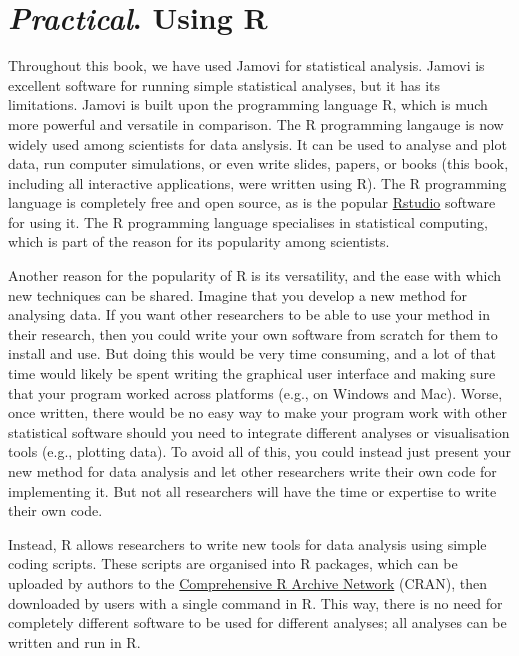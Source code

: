 \documentclass[
]{scrbook}
\begin{document}
\hypertarget{Chapter_35}{%
\chapter{\texorpdfstring{\emph{Practical}. Using R}{Practical. Using R}}\label{Chapter_35}}

Throughout this book, we have used Jamovi for statistical analysis.
Jamovi is excellent software for running simple statistical analyses, but it has its limitations.
Jamovi is built upon the programming language R, which is much more powerful and versatile in comparison.
The R programming langauge is now widely used among scientists for data anslysis.
It can be used to analyse and plot data, run computer simulations, or even write slides, papers, or books (this book, including all interactive applications, were written using R).
The R programming language is completely free and open source, as is the popular \href{https://posit.co/downloads/}{Rstudio} software for using it.
The R programming language specialises in statistical computing, which is part of the reason for its popularity among scientists.

Another reason for the popularity of R is its versatility, and the ease with which new techniques can be shared.
Imagine that you develop a new method for analysing data.
If you want other researchers to be able to use your method in their research, then you could write your own software from scratch for them to install and use.
But doing this would be very time consuming, and a lot of that time would likely be spent writing the graphical user interface and making sure that your program worked across platforms (e.g., on Windows and Mac).
Worse, once written, there would be no easy way to make your program work with other statistical software should you need to integrate different analyses or visualisation tools (e.g., plotting data).
To avoid all of this, you could instead just present your new method for data analysis and let other researchers write their own code for implementing it.
But not all researchers will have the time or expertise to write their own code.

Instead, R allows researchers to write new tools for data analysis using simple coding scripts.
These scripts are organised into R packages, which can be uploaded by authors to the \href{https://cran.r-project.org/}{Comprehensive R Archive Network} (CRAN), then downloaded by users with a single command in R.
This way, there is no need for completely different software to be used for different analyses; all analyses can be written and run in R.
\end{document}
